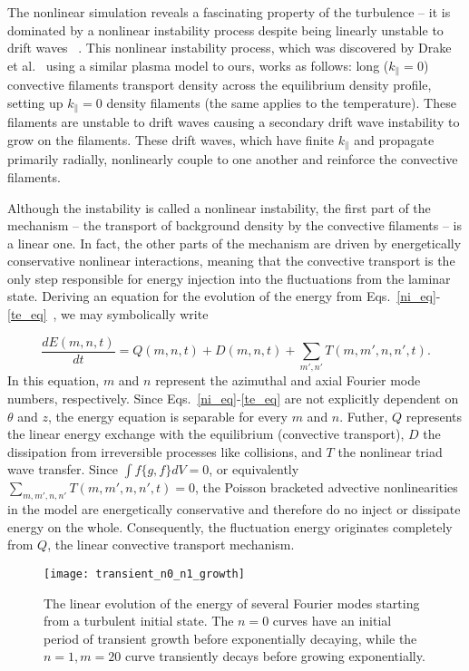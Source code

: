 \documentclass[showpacs,preprintnumbers,amsmath,amssymb,superscriptaddress,aip]{revtex4-1}
\def\beq{\begin{equation}}
\def\eeq{\end{equation}}
\def\para{\parallel}
\newcommand{\diff}[2]{\frac{d#1}{d#2}}
\begin{document}
The nonlinear simulation reveals a fascinating property of the turbulence -- it is dominated by a nonlinear instability process despite being linearly unstable to drift waves
~\cite{friedman2012b,friedman2013}.
This nonlinear instability process, which was discovered by Drake et al.~\cite{drake1995} using a similar plasma model to ours, works as follows: 
long ($k_\para=0$) convective filaments transport density across the equilibrium density profile, setting up $k_\para=0$ density filaments (the same applies to the temperature). 
These filaments are unstable to drift waves causing a secondary drift wave instability to grow on the filaments. 
These drift waves, which have finite $k_\para$ and propagate primarily radially, nonlinearly couple to one another and reinforce the convective filaments.

Although the instability is called a nonlinear instability, the first part of the mechanism -- the transport of background density by the convective filaments -- is a linear one.
In fact, the other parts of the mechanism are driven by energetically conservative nonlinear interactions, 
meaning that the convective transport is the only step responsible for energy injection into the fluctuations from the laminar state.
Deriving an equation for the evolution of the energy from Eqs.~\ref{ni_eq}-\ref{te_eq}~\cite{friedman2012b,friedman2013}, we may symbolically write

\beq
\label{dEdt_def}
\diff{E(m,n,t)}{t} = Q(m,n,t) + D(m,n,t) + \sum_{m',n'} T(m,m',n,n',t).
\eeq
In this equation, $m$ and $n$ represent the azimuthal and axial Fourier mode numbers, respectively. 
Since Eqs.~\ref{ni_eq}-\ref{te_eq} are not explicitly dependent on $\theta$ and $z$, the energy equation is separable for every $m$ and $n$. 
Futher, $Q$ represents the linear energy exchange with the equilibrium (convective transport), $D$ the dissipation from irreversible processes
like collisions, and $T$ the nonlinear triad wave transfer. Since $\int f \{g,f\} dV = 0$, or equivalently $\sum_{m,m',n,n'} T(m,m',n,n',t)=0$, 
the Poisson bracketed advective nonlinearities in the model are energetically conservative and therefore do no inject or dissipate energy on the whole.
Consequently, the fluctuation energy originates completely from $Q$, the linear convective transport mechanism.

\begin{figure}
\centerline{\texttt{[image: transient\_n0\_n1\_growth]}}
\caption{The linear evolution of the energy of several Fourier modes starting from a turbulent initial state. The $n=0$ curves have an initial period of transient growth before exponentially decaying,
while the $n=1,m=20$ curve transiently decays before growing exponentially.}
\label{transient_n0_n1_growth}
\end{figure}
\end{document}
